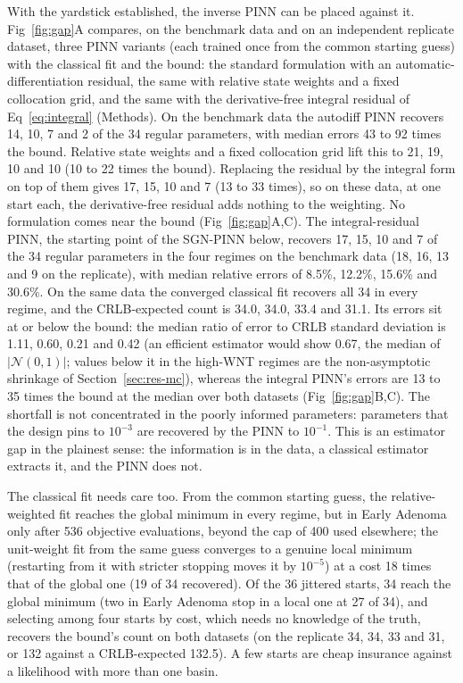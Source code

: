 With the yardstick established, the inverse PINN can be placed against it.
Fig~\ref{fig:gap}A compares, on the benchmark data and on an independent
replicate dataset, three PINN variants (each trained once from the common
starting guess) with the classical fit and the bound: the standard formulation
with an automatic-differentiation residual, the same with relative state
weights and a fixed collocation grid, and the same with the derivative-free
integral residual of Eq~\eqref{eq:integral} (Methods). On the benchmark data the
autodiff PINN recovers 14, 10, 7 and 2 of the 34 regular parameters, with
median errors 43 to 92 times the bound. Relative state weights and a fixed
collocation grid lift this to 21, 19, 10 and 10 (10 to 22 times the bound).
Replacing the residual by the integral form on top of them gives 17, 15, 10
and 7 (13 to 33 times), so on these data, at one start each, the
derivative-free residual adds nothing to the weighting. No formulation comes
near the bound (Fig~\ref{fig:gap}A,C).
The integral-residual PINN, the starting point of the SGN-PINN below,
recovers 17, 15, 10 and 7 of the 34 regular
parameters in the four regimes on the benchmark data (18, 16, 13 and 9 on the
replicate), with median relative errors of 8.5\%, 12.2\%, 15.6\% and 30.6\%. On
the same data the converged classical fit recovers all 34 in every regime, and
the CRLB-expected count is 34.0, 34.0, 33.4 and 31.1. Its errors sit at or below
the bound: the median ratio of error to CRLB standard deviation is 1.11, 0.60,
0.21 and 0.42 (an efficient estimator would show 0.67, the median of
$|\mathcal{N}(0,1)|$; values below it in the high-WNT regimes are the
non-asymptotic shrinkage of Section~\ref{sec:res-mc}), whereas the integral PINN's errors
are 13 to 35 times the bound at the median over both datasets (Fig~\ref{fig:gap}B,C). The
shortfall is not concentrated in the poorly informed parameters: parameters
that the design pins to $10^{-3}$ are recovered by the PINN to $10^{-1}$. This
is an estimator gap in the plainest sense: the information is in the data, a
classical estimator extracts it, and the PINN does not.

The classical fit needs care too. From the common starting guess, the
relative-weighted fit reaches the global minimum in every regime, but in Early
Adenoma only after 536 objective evaluations, beyond the cap of 400 used
elsewhere; the unit-weight fit from the same guess converges to a genuine local minimum
(restarting from it with stricter stopping moves it by $10^{-5}$) at a cost 18
times that of the global one (19 of 34 recovered). Of the 36 jittered
starts, 34 reach the global minimum (two in Early Adenoma stop in a local one
at 27 of 34), and selecting among four starts by cost, which
needs no knowledge of the truth, recovers the bound's count on both datasets
(on the replicate 34, 34, 33 and 31, or 132 against a CRLB-expected 132.5). A few starts are cheap insurance against a likelihood with more
than one basin.

